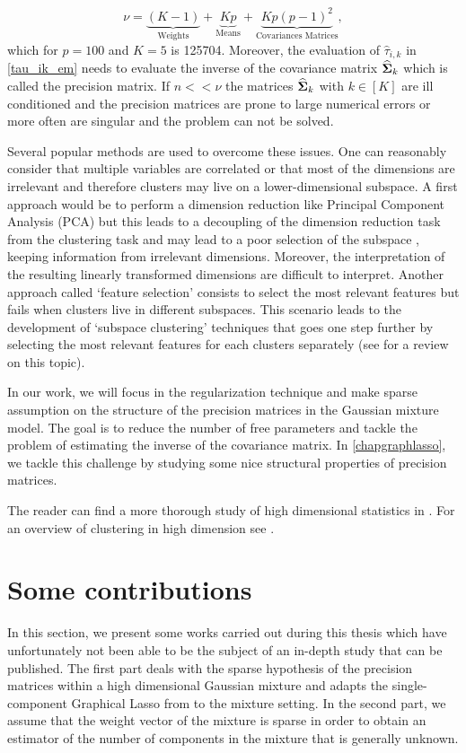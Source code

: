 \begin{equation}
   \nu = \underbrace{(K-1)}_\text{Weights}+ \underbrace{Kp}_\text{Means} + \underbrace{Kp(p-1)^2}_\text{Covariances Matrices},
 \end{equation}
which for $p=100$ and $K=5$ is 125704. Moreover, the evaluation of $\hat\tau_{i,k}$ in \cref{tau_ik_em} needs to evaluate the inverse of the covariance matrix $\widehat{\boldsymbol\Sigma}_k$ which is called the precision matrix. If $n<<\nu$ the matrices $\widehat{\boldsymbol\Sigma}_k$ with $ k\in[K]$ are ill conditioned and the precision matrices are prone to large numerical errors or more often are singular and the problem can not be solved.

Several popular methods are used to overcome these issues. One can reasonably consider that multiple variables are correlated or that most of the dimensions are irrelevant and therefore clusters may live on a lower-dimensional subspace. A first approach would be to perform a dimension reduction like Principal Component Analysis (PCA) but this leads to a decoupling of the dimension reduction task from the clustering task and may lead to a poor selection of the subspace \citep{bouveyron:hal-00750909}, keeping information from irrelevant dimensions. Moreover, the interpretation of the resulting linearly transformed dimensions are difficult to interpret. Another approach called `feature selection' consists to select the most relevant features but fails when clusters live in different subspaces. This scenario leads to the development of `subspace clustering' techniques that goes one step further by selecting the most relevant features for each clusters separately (see \citep{Parsons:2004:SCH:1007730.1007731} for a review on this topic). 

In our work, we will focus in the regularization technique and make sparse assumption on the structure of the precision matrices in the Gaussian mixture model. The goal is to reduce the number of free parameters and tackle the problem of estimating the inverse of the covariance matrix. In \cref{chapgraphlasso}, we tackle this challenge by studying some nice structural properties of precision matrices.

The reader can find a more thorough study of high dimensional statistics in \cite{giraud2014introduction,Zimek2012}. For an overview of clustering in high dimension see \citep{bouveyron:hal-00750909,Parsons:2004:SCH:1007730.1007731}.
\section{Some contributions}
In this section, we present some works carried out during this thesis which have unfortunately not been able to be the subject of an in-depth study that can be published. The first part deals with the sparse hypothesis of the precision matrices within a high dimensional Gaussian mixture and adapts the single-component Graphical Lasso from \citep{glasso07} to the mixture setting. In the second part, we assume that the weight vector of the mixture is sparse in order to obtain an estimator of the number of components in the mixture that is generally unknown. 
